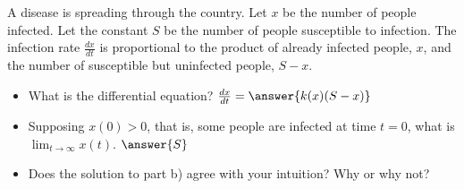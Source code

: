 \documentclass{ximera}
\begin{document}

\begin{exercise}
    A disease is spreading through the country.  Let $x$ be the number of people infected.  Let the constant $S$ be the number of people susceptible to infection.  The infection rate $\frac{dx}{dt}$ is proportional to the product of already infected people, $x$, and the number of susceptible but uninfected people, $S-x$.
    \begin{itemize}
        \item What is the differential equation? $\frac{dx}{dt} = \answer{k(x)(S - x)}$
        \item Supposing $x(0) > 0$, that is, some people are infected at time $t=0$, what is $\displaystyle \lim_{t\to\infty} x(t)$. $\answer{S}$
        \item Does the solution to part b) agree with your intuition?  Why or why not?
    \end{itemize}
\end{exercise}


\end{document}
